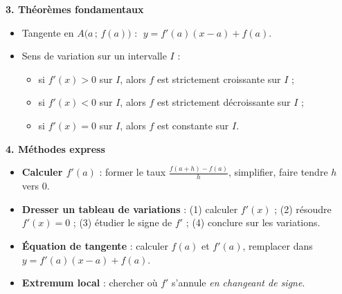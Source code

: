 \documentclass[11pt]{article}
\newcommand{\cle}[1]{{\popxbold\color{popdark}#1}}
\begin{document}
\begin{bilan}
\textbf{3. Théorèmes fondamentaux}
\begin{itemize}
  \item \cle{Tangente} en $A\bigl(a\,;\,f(a)\bigr)$ : $\;y=f'(a)(x-a)+f(a)$.
  \item \cle{Sens de variation} sur un intervalle $I$ :
  \begin{itemize}
    \item si $f'(x)>0$ sur $I$, alors $f$ est strictement croissante sur $I$ ;
    \item si $f'(x)<0$ sur $I$, alors $f$ est strictement décroissante sur $I$ ;
    \item si $f'(x)=0$ sur $I$, alors $f$ est constante sur $I$.
  \end{itemize}
\end{itemize}

\textbf{4. Méthodes express}
\begin{itemize}
  \item \textbf{Calculer $f'(a)$} : former le taux $\frac{f(a+h)-f(a)}{h}$, simplifier, faire tendre $h$ vers $0$.
  \item \textbf{Dresser un tableau de variations} : (1) calculer $f'(x)$ ; (2) résoudre $f'(x)=0$ ; (3) étudier le signe de $f'$ ; (4) conclure sur les variations.
  \item \textbf{Équation de tangente} : calculer $f(a)$ et $f'(a)$, remplacer dans $y=f'(a)(x-a)+f(a)$.
  \item \textbf{Extremum local} : chercher où $f'$ s'annule \emph{en changeant de signe}.
\end{itemize}
\end{bilan}
\end{document}
